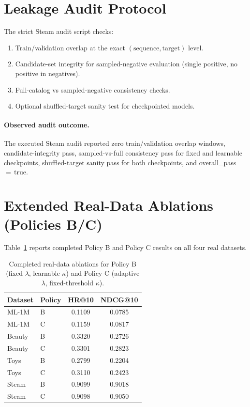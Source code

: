\documentclass[11pt]{article}
\begin{document}
\section{Leakage Audit Protocol}
The strict Steam audit script checks:
\begin{enumerate}[leftmargin=*]
  \item Train/validation overlap at the exact $(\mathrm{sequence}, \mathrm{target})$ level.
  \item Candidate-set integrity for sampled-negative evaluation (single positive, no positive in negatives).
  \item Full-catalog vs sampled-negative consistency checks.
  \item Optional shuffled-target sanity test for checkpointed models.
\end{enumerate}

\paragraph{Observed audit outcome.}
The executed Steam audit reported zero train/validation overlap windows,
candidate-integrity pass, sampled-vs-full consistency pass for fixed and
learnable checkpoints, shuffled-target sanity pass for both checkpoints,
and overall\_pass $=\,$true.

\section{Extended Real-Data Ablations (Policies B/C)}
Table~\ref{tab:ablation_bc_real} reports completed Policy B and Policy C
results on all four real datasets.

\begin{table}[h]
\centering
\caption{Completed real-data ablations for Policy B (fixed $\lambda$, learnable $\kappa$)
and Policy C (adaptive $\lambda$, fixed-threshold $\kappa$).}
\label{tab:ablation_bc_real}
\begin{tabular}{llcc}
\toprule
Dataset & Policy & HR@10 & NDCG@10 \\
\midrule
ML-1M  & B & 0.1109 & 0.0785 \\
ML-1M  & C & 0.1159 & 0.0817 \\
Beauty & B & 0.3320 & 0.2726 \\
Beauty & C & 0.3301 & 0.2823 \\
Toys   & B & 0.2799 & 0.2204 \\
Toys   & C & 0.3110 & 0.2423 \\
Steam  & B & 0.9099 & 0.9018 \\
Steam  & C & 0.9098 & 0.9050 \\
\bottomrule
\end{tabular}
\end{table}
\end{document}
